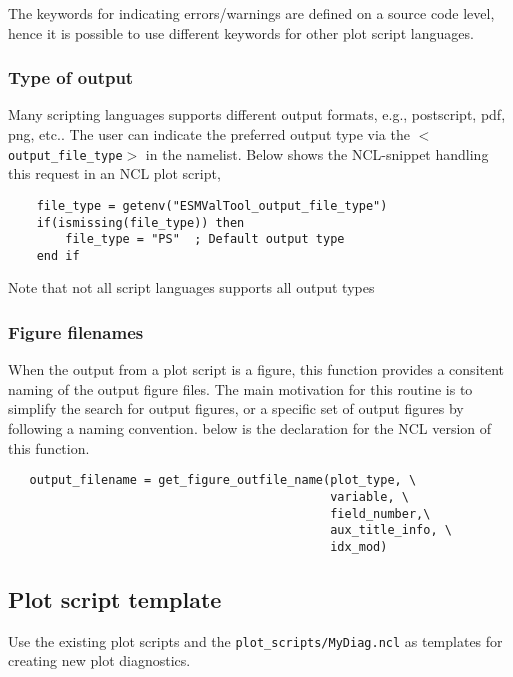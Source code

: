 \documentclass[12pt]{article}
\newcommand{\xmltag}[1]{\texttt{$<$#1$>$}}
\begin{document}
The keywords for indicating errors/warnings are defined on a source
code level, hence it is possible to use different keywords for other
plot script languages.

\subsubsection{Type of output}
Many scripting languages supports different output formats, e.g.,
postscript, pdf, png, etc.. The user can indicate the preferred output
type via the \xmltag{output\_file\_type} in the namelist. Below shows
the NCL-snippet handling this request in an NCL plot script,
\begin{Verbatim}
    file_type = getenv("ESMValTool_output_file_type")
    if(ismissing(file_type)) then
        file_type = "PS"  ; Default output type
    end if
\end{Verbatim}
Note that not all script languages supports all output types

\subsubsection{Figure filenames}
When the output from a plot script is a figure, this function provides
a consitent naming of the output figure files. The main motivation for
this routine is to simplify the search for output figures, or a
specific set of output figures by following a naming convention. below
is the declaration for the NCL version of this function.
\begin{Verbatim}
   output_filename = get_figure_outfile_name(plot_type, \
                                             variable, \
                                             field_number,\
                                             aux_title_info, \
                                             idx_mod)
\end{Verbatim}


\subsection{Plot script template}
Use the existing plot scripts and the \texttt{plot\_scripts/MyDiag.ncl}
as templates for creating new plot diagnostics. 

\end{document}
